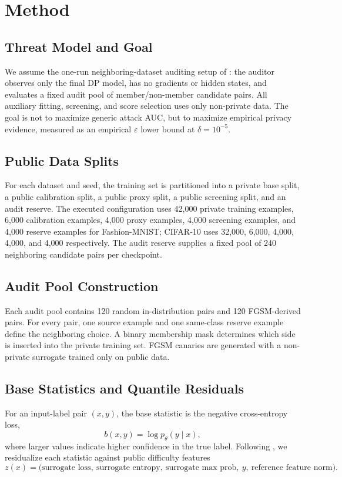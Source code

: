 \documentclass{article}
\newcommand{\eps}{\varepsilon}
\newcommand{\del}{\delta}
\begin{document}
\section{Method}
\label{sec:method}

\subsection{Threat Model and Goal}
We assume the one-run neighboring-dataset auditing setup of \citet{steinke2023privacy}: the auditor observes only the final DP model, has no gradients or hidden states, and evaluates a fixed audit pool of member/non-member candidate pairs. All auxiliary fitting, screening, and score selection uses only non-private data. The goal is not to maximize generic attack AUC, but to maximize empirical privacy evidence, measured as an empirical \(\eps\) lower bound at \(\del=10^{-5}\).

\subsection{Public Data Splits}
For each dataset and seed, the training set is partitioned into a private base split, a public calibration split, a public proxy split, a public screening split, and an audit reserve. The executed configuration uses 42{,}000 private training examples, 6{,}000 calibration examples, 4{,}000 proxy examples, 4{,}000 screening examples, and 4{,}000 reserve examples for Fashion-MNIST; CIFAR-10 uses 32{,}000, 6{,}000, 4{,}000, 4{,}000, and 4{,}000 respectively. The audit reserve supplies a fixed pool of 240 neighboring candidate pairs per checkpoint.

\subsection{Audit Pool Construction}
Each audit pool contains 120 random in-distribution pairs and 120 FGSM-derived pairs. For every pair, one source example and one same-class reserve example define the neighboring choice. A binary membership mask determines which side is inserted into the private training set. FGSM canaries are generated with a non-private surrogate trained only on public data.

\subsection{Base Statistics and Quantile Residuals}
For an input-label pair \((x,y)\), the base statistic is the negative cross-entropy loss,
\[
b(x,y) = \log p_\theta(y \mid x),
\]
where larger values indicate higher confidence in the true label. Following \citet{liu2025enhancing}, we residualize each statistic against public difficulty features
\[
z(x) = \big(\text{surrogate loss},\ \text{surrogate entropy},\ \text{surrogate max prob},\ y,\ \text{reference feature norm}\big).
\]
\end{document}
